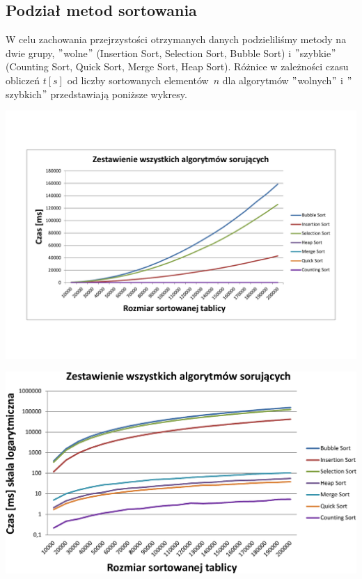 \documentclass[polish,polish,a4paper]{article}
\begin{document}
\begin{spacing}{1.5}
	\subsection{Podział metod sortowania}
	W celu zachowania przejrzystości  otrzymanych danych podzieliliśmy metody na dwie grupy, $ " $wolne$ " $ (Insertion Sort, Selection Sort, Bubble Sort) i $ " $szybkie$ " $ (Counting Sort, Quick Sort, Merge Sort, Heap Sort). Różnice w zależności czasu obliczeń $ t[s]$ od liczby sortowanych elementów~$ n $ dla algorytmów $ " $wolnych$ " $ i $ " $szybkich$ " $ przedstawiają poniższe wykresy.\\
	
	
\begin{minipage}[H]{\textwidth}
	\centering
	\includegraphics[scale=0.6]{zad2wsznor.pdf}
	\label{fig:2wszn}
\end{minipage}

\begin{minipage}[H]{\textwidth}
	\centering
	\includegraphics[scale=0.6]{zad2wszlog.pdf}
	\label{fig:2wszl}
\end{minipage}
	

\end{spacing}
\end{document}
